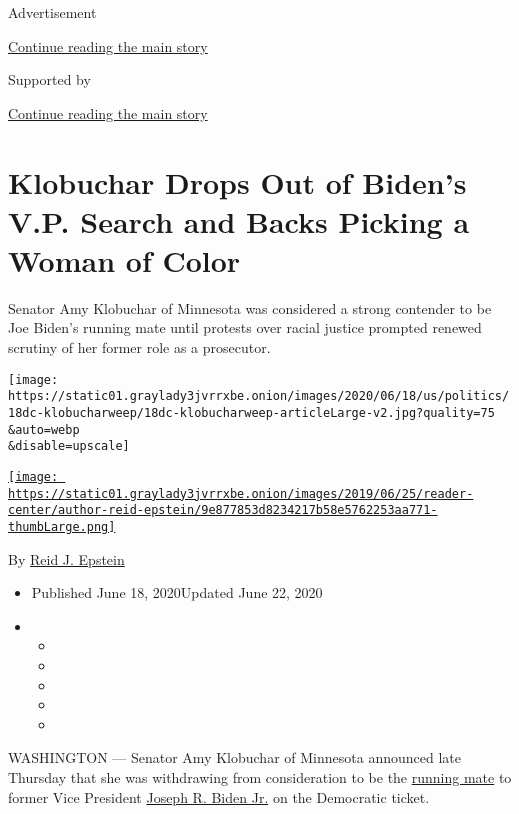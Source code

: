 Advertisement

\protect\hyperlink{after-top}{Continue reading the main story}

Supported by

\protect\hyperlink{after-sponsor}{Continue reading the main story}

\hypertarget{klobuchar-drops-out-of-bidens-vp-search-and-backs-picking-a-woman-of-color}{%
\section{Klobuchar Drops Out of Biden's V.P. Search and Backs Picking a
Woman of
Color}\label{klobuchar-drops-out-of-bidens-vp-search-and-backs-picking-a-woman-of-color}}

Senator Amy Klobuchar of Minnesota was considered a strong contender to
be Joe Biden's running mate until protests over racial justice prompted
renewed scrutiny of her former role as a prosecutor.

\texttt{[image: https://static01.graylady3jvrrxbe.onion/images/2020/06/18/us/politics/18dc-klobucharweep/18dc-klobucharweep-articleLarge-v2.jpg?quality=75\\\&auto=webp\\\&disable=upscale]}

\href{https://www.nytimes3xbfgragh.onion/by/reid-j-epstein}{\texttt{[image: https://static01.graylady3jvrrxbe.onion/images/2019/06/25/reader-center/author-reid-epstein/9e877853d8234217b58e5762253aa771-thumbLarge.png]}}

By \href{https://www.nytimes3xbfgragh.onion/by/reid-j-epstein}{Reid J.
Epstein}

\begin{itemize}
\item
  Published June 18, 2020Updated June 22, 2020
\item
  \begin{itemize}
  \item
  \item
  \item
  \item
  \item
  \end{itemize}
\end{itemize}

WASHINGTON --- Senator Amy Klobuchar of Minnesota announced late
Thursday that she was withdrawing from consideration to be the
\href{https://www.nytimes3xbfgragh.onion/article/biden-vice-president-2020.html}{running
mate} to former Vice President
\href{https://www.nytimes3xbfgragh.onion/interactive/2020/us/elections/joe-biden.html}{Joseph
R. Biden Jr.} on the Democratic ticket.

